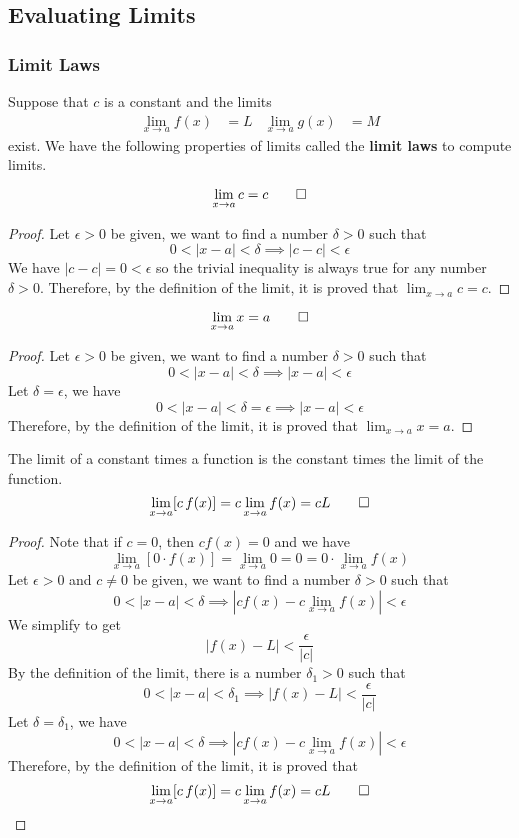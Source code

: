 \subsection{Evaluating Limits}

\subsubsection{Limit Laws}
Suppose that \(c\) is a constant and the limits
\begin{align*}
    \lim_{x\to a}f(x)&=L&\lim_{x\to a}g(x)&=M
\end{align*}
exist.
We have the following properties of limits called the \textbf{limit laws} to
compute limits.
\begin{theorem}
    \[\lim_{x\to a}c=c\qedhere\]
\end{theorem}
\begin{proof}
    Let \(\epsilon>0\) be given, we want to find a number \(\delta>0\) such
    that \[0<|x-a|<\delta\implies|c-c|<\epsilon\]
    We have \(|c-c|=0<\epsilon\) so the trivial inequality is always true for
    any number \(\delta>0\).
    Therefore, by the definition of the limit, it is proved that
    \(\displaystyle{\lim_{x\to a}c=c}\).
\end{proof}
\begin{theorem}
    \[\lim_{x\to a}x=a\qedhere\]
\end{theorem}
\begin{proof}
    Let \(\epsilon>0\) be given, we want to find a number \(\delta>0\) such
    that \[0<|x-a|<\delta\implies|x-a|<\epsilon\]
    Let \(\delta=\epsilon\), we have
    \[0<|x-a|<\delta=\epsilon\implies|x-a|<\epsilon\]
    Therefore, by the definition of the limit, it is proved that
    \(\displaystyle{\lim_{x\to a}x=a}\).
\end{proof}
\begin{theorem}
    The limit of a constant times a function is the constant times the limit
    of the function.
    \[\lim_{x\to a}[c\,f(x)]=c\lim_{x\to a}f(x)=cL\qedhere\]
\end{theorem}
\begin{proof}
    Note that if \(c=0\), then \(cf(x)=0\) and we have
    \[\lim_{x\to a}[0\cdot f(x)]=\lim_{x\to a}0=0=0\cdot\lim_{x\to a}f(x)\]
    Let \(\epsilon>0\) and \(c\neq0\) be given, we want to find a number
    \(\delta>0\) such that
    \[0<|x-a|<\delta\implies|cf(x)-c\lim_{x\to a}f(x)|<\epsilon\]
    We simplify to get \[|f(x)-L|<\frac{\epsilon}{|c|}\]
    By the definition of the limit, there is a number \(\delta_1>0\) such that
    \[0<|x-a|<\delta_1\implies|f(x)-L|<\frac{\epsilon}{|c|}\]
    Let \(\delta=\delta_1\), we have
    \[0<|x-a|<\delta\implies|cf(x)-c\lim_{x\to a}f(x)|<\epsilon\]
    Therefore, by the definition of the limit, it is proved that
    \[\lim_{x\to a}[c\,f(x)]=c\lim_{x\to a}f(x)=cL\qedhere\]
\end{proof}
